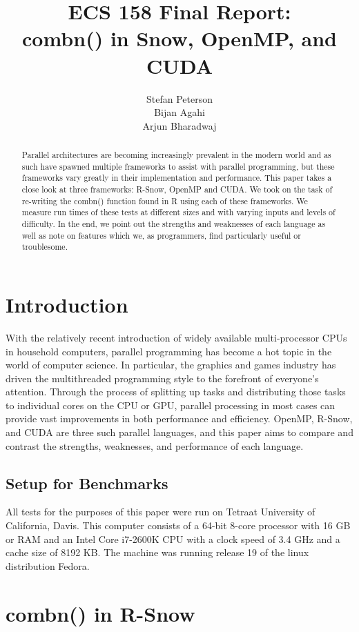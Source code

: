 \documentclass[titlepage, 11pt]{article}
\title{\Huge ECS 158 Final Report: \\\LARGE combn() in Snow, OpenMP, and CUDA}
\date{}
\author{\huge Stefan Peterson\\\huge Bijan Agahi \\\huge Arjun Bharadwaj}
\begin{document}
\maketitle
\begin{abstract}
Parallel architectures are becoming increasingly prevalent in the modern world and as such have spawned multiple frameworks to assist with parallel programming, but these frameworks vary greatly in their implementation and performance. This paper takes a close look at three frameworks: R-Snow, OpenMP and CUDA. We took on the task of re-writing the combn() function found in R using each of these frameworks. We measure run times of these tests at different sizes and with varying inputs and levels of difficulty. In the end, we point out the strengths and weaknesses of each language as well as note on features which we, as programmers, find particularly useful or troublesome.
\end{abstract}
\tableofcontents
\newpage
\section{Introduction}
With the relatively recent introduction of widely available multi-processor CPUs in household computers, parallel programming has become a hot topic in the world of computer science. In particular, the graphics and games industry has driven the multithreaded programming style to the forefront of everyone's attention. Through the process of splitting up tasks and distributing those tasks to individual cores on the CPU or GPU, parallel processing in most cases can provide vast improvements in both performance and efficiency. OpenMP, R-Snow, and CUDA are three such parallel languages, and this paper aims to compare and contrast the strengths, weaknesses, and performance of each language.

\subsection{Setup for Benchmarks}
All tests for the purposes of this paper were run on Tetraat University of California, Davis. This computer consists of a 64-bit 8-core processor with 16 GB or RAM and an Intel Core i7-2600K CPU with a clock speed of 3.4 GHz and a cache size of 8192 KB. The machine was running release 19 of the linux distribution Fedora.

\section{combn() in R-Snow}
\end{document}
